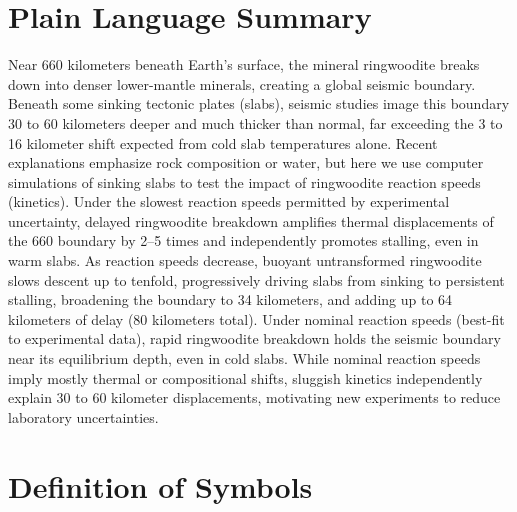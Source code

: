 \documentclass[draft,linenumbers]{agujournal2019}
\begin{document}
\section*{Plain Language Summary}
Near 660 kilometers beneath Earth's surface, the mineral ringwoodite
breaks down into denser lower-mantle minerals, creating a global seismic
boundary. Beneath some sinking tectonic plates (slabs), seismic studies
image this boundary 30 to 60 kilometers deeper and much thicker than
normal, far exceeding the 3 to 16 kilometer shift expected from cold
slab temperatures alone. Recent explanations emphasize rock composition
or water, but here we use computer simulations of sinking slabs to test
the impact of ringwoodite reaction speeds (kinetics). Under the slowest
reaction speeds permitted by experimental uncertainty, delayed
ringwoodite breakdown amplifies thermal displacements of the 660
boundary by 2--5 times and independently promotes stalling, even in warm
slabs. As reaction speeds decrease, buoyant untransformed ringwoodite
slows descent up to tenfold, progressively driving slabs from sinking to
persistent stalling, broadening the boundary to 34 kilometers, and
adding up to 64 kilometers of delay (80 kilometers total). Under nominal
reaction speeds (best-fit to experimental data), rapid ringwoodite
breakdown holds the seismic boundary near its equilibrium depth, even in
cold slabs. While nominal reaction speeds imply mostly thermal or
compositional shifts, sluggish kinetics independently explain 30 to 60
kilometer displacements, motivating new experiments to reduce laboratory
uncertainties.

\clearpage

\section*{Definition of Symbols}\label{sec:definition-of-symbols}
\end{document}

